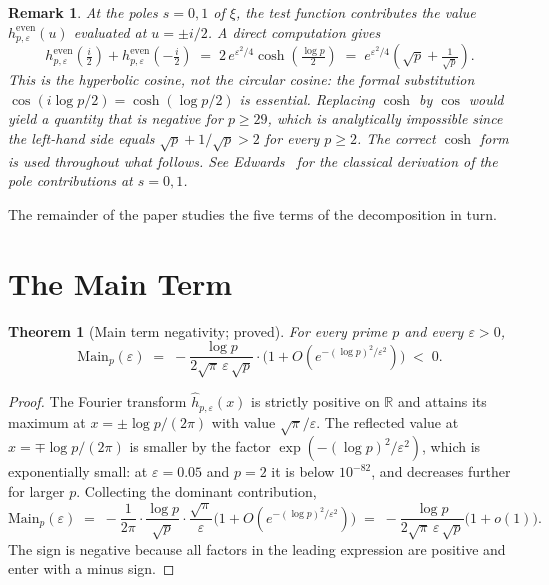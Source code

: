\documentclass[11pt]{article}
\newtheorem{theorem}{Theorem}[section]
\newtheorem*{remark}{Remark}
\begin{document}
\begin{remark}
At the poles $s=0,1$ of $\xi$, the test function contributes the value
$h^{\mathrm{even}}_{p,\varepsilon}(u)$ evaluated at $u=\pm i/2$.
A direct computation gives
\[
h^{\mathrm{even}}_{p,\varepsilon}\!\left(\tfrac{i}{2}\right)
+ h^{\mathrm{even}}_{p,\varepsilon}\!\left(-\tfrac{i}{2}\right)
\;=\; 2\,e^{\varepsilon^2/4}\cosh\!\left(\tfrac{\log p}{2}\right)
\;=\; e^{\varepsilon^2/4}\!\left(\sqrt p + \tfrac{1}{\sqrt p}\right).
\]
This is the hyperbolic cosine, not the circular cosine: the formal
substitution $\cos(i\log p/2)=\cosh(\log p/2)$ is essential.
Replacing $\cosh$ by $\cos$ would yield a quantity that is negative
for $p\ge 29$, which is analytically impossible since the left-hand
side equals $\sqrt p + 1/\sqrt p>2$ for every $p\ge 2$.
The correct $\cosh$ form is used throughout what follows.
See Edwards~\cite[\S1.16 and \S3.6]{Edwards} for the classical derivation
of the pole contributions at $s=0,1$.
\end{remark}

The remainder of the paper studies the five terms of the decomposition
in turn.

\section{The Main Term}
\label{sec:main}

\begin{theorem}[Main term negativity; proved]
\label{thm:main-neg}
For every prime $p$ and every $\varepsilon>0$,
\[
\mathrm{Main}_p(\varepsilon) \;=\; -\frac{\log p}{2\sqrt\pi\,\varepsilon\,\sqrt p}
\cdot\bigl(1 + O(e^{-(\log p)^2/\varepsilon^2})\bigr)
\;<\; 0.
\]
\end{theorem}

\begin{proof}
The Fourier transform $\widehat{h}_{p,\varepsilon}(x)$ is strictly
positive on $\mathbb R$ and attains its maximum at
$x=\pm\log p/(2\pi)$ with value $\sqrt\pi/\varepsilon$.
The reflected value at $x=\mp\log p/(2\pi)$ is smaller by the factor
$\exp(-(\log p)^2/\varepsilon^2)$, which is exponentially small: at
$\varepsilon=0.05$ and $p=2$ it is below $10^{-82}$, and decreases
further for larger $p$.
Collecting the dominant contribution,
\[
\mathrm{Main}_p(\varepsilon) \;=\; -\frac{1}{2\pi}\cdot\frac{\log p}{\sqrt p}
\cdot\frac{\sqrt\pi}{\varepsilon}
\bigl(1 + O(e^{-(\log p)^2/\varepsilon^2})\bigr)
\;=\; -\frac{\log p}{2\sqrt\pi\,\varepsilon\,\sqrt p}\bigl(1+o(1)\bigr).
\]
The sign is negative because all factors in the leading expression are
positive and enter with a minus sign.
\end{proof}
\end{document}
